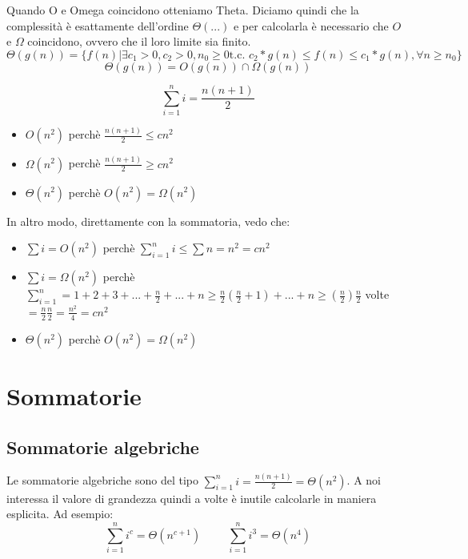 Quando O e Omega coincidono otteniamo Theta. Diciamo quindi che la complessità è esattamente dell'ordine $\Theta(...)$ e per calcolarla 
è necessario che $O$ e $\Omega$ coincidono, ovvero che il loro limite sia finito.
\begin{equation*}
    \Theta(g(n)) = \{f(n)| \exists c_1>0,c_2>0,n_0\geq0 \text {t.c. } c_2*g(n)\leq f(n)\leq c_1*g(n),\forall n \geq n_0\}
\end{equation*}
\begin{equation*}
    \Theta(g(n)) = O(g(n)) \cap \Omega(g(n))
\end{equation*}
\begin{example}
    \begin{equation*}
        \sum^n_{i=1}i=\frac{n(n+1)}{2}
    \end{equation*}
    \begin{itemize}
        \item[-] $O(n^2)$ perchè $\frac{n(n+1)}{2}\leq cn^2$
        \item[-] $\Omega(n^2)$ perchè $\frac{n(n+1)}{2}\geq cn^2$
        \item[-] $\Theta(n^2)$ perchè $O(n^2)=\Omega(n^2)$
    \end{itemize}
    
    In altro modo, direttamente con la sommatoria, vedo che:
    \begin{itemize}
        \item[-] $\sum i=O(n^2)$ perchè $\sum^n_{i=1}i\leq\sum n=n^2=cn^2$
        \item[-] $\sum i=\Omega(n^2)$ perchè $\sum^n_{i=1}=1+2+3+...+\frac{n}{2}+...+n\geq\frac{n}{2}(\frac{n}{2}+1)+...+n\geq(\frac{n}{2})\frac{n}{2}$ volte $=\frac{n}{2}\frac{n}{2}=\frac{n^2}{4}=cn^2$
        \item[-] $\Theta(n^2)$ perchè $O(n^2)=\Omega(n^2)$
    \end{itemize}
\end{example}

\chapter{Sommatorie}
\section{Sommatorie algebriche}
Le sommatorie algebriche sono del tipo $\sum^n_{i=1}i=\frac{n(n+1)}{2}=\Theta(n^2)$. A noi interessa il valore di grandezza quindi a volte è inutile calcolarle in maniera esplicita. Ad esempio:
\begin{equation*}
    \sum^n_{i=1}i^c=\Theta(n^{c+1})\hspace{1cm}\sum^n_{i=1}i^3=\Theta(n^4)
\end{equation*}

